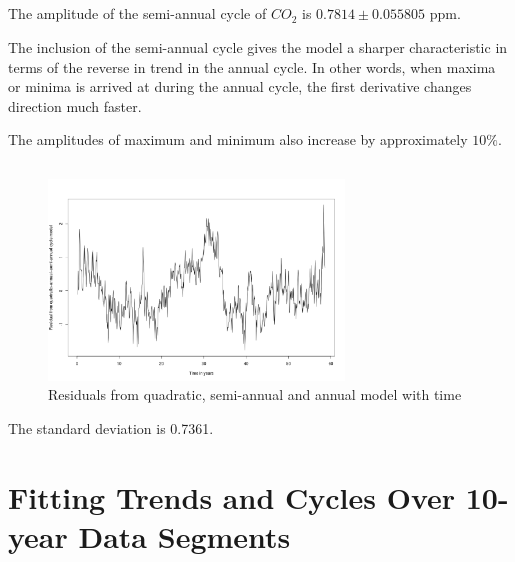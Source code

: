 \documentclass[paper=a4, fontsize=11pt]{scrartcl}
\numberwithin{equation}{section} %
\numberwithin{figure}{section} %
\numberwithin{table}{section} %
\begin{document}
\subsection{}

The amplitude of the semi-annual cycle of $CO_2$ is $0.7814\pm0.055805$ ppm.

The inclusion of the semi-annual cycle gives the model a sharper characteristic in terms of the reverse in trend in the annual cycle. In other words, when maxima or minima is arrived at during the annual cycle, the first derivative changes direction much faster.

The amplitudes of maximum and minimum also increase by approximately $10\%$.

\pagebreak

\subsection{}
\begin{figure}[htp]
	\centering
	\includegraphics[width=0.7\textwidth, clip]{q2e.png} 
	\caption{Residuals from quadratic, semi-annual and annual model with time}
\end{figure}
The standard deviation is 0.7361.

\pagebreak
\section{Fitting Trends and Cycles Over 10-year Data Segments}

\subsection{}
\end{document}
